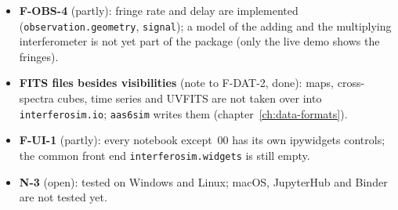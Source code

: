 \begin{itemize}
  \item \textbf{F-OBS-4} (partly): fringe rate and delay are implemented
        (\texttt{observation.geometry}, \texttt{signal}); a model of the
        adding and the multiplying interferometer is not yet part of the
        package (only the live demo shows the fringes).
  \item \textbf{FITS files besides visibilities} (note to F-DAT-2, done):
        maps, cross-spectra cubes, time series and UVFITS are not taken
        over into \texttt{interferosim.io}; \texttt{aas6sim} writes them
        (chapter~\ref{ch:data-formats}).
  \item \textbf{F-UI-1} (partly): every notebook except~00 has its own
        ipywidgets controls; the common front end
        \texttt{interferosim.widgets} is still empty.
  \item \textbf{N-3} (open): tested on Windows and Linux; macOS,
        JupyterHub and Binder are not tested yet.
\end{itemize}

